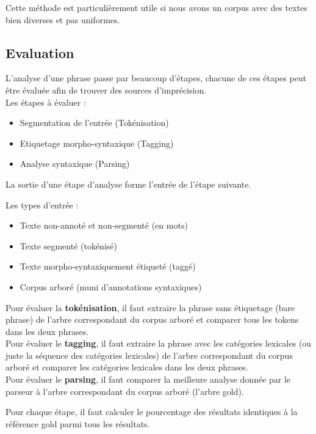 \documentclass[12pt]{article}
\begin{document}
Cette m\'ethode est particuli\`erement utile si nous avons un corpus avec des
textes bien diverses et pas uniformes. 

\subsection{Evaluation}

L'analyse d'une phrase passe par beaucoup d'\'etapes, chacune de ces \'etapes peut
\^etre \'evalu\'ee afin de trouver des sources d'impr\'ecision.\\

Les \'etapes \`a \'evaluer :
\begin{itemize}
\item Segmentation de l'entr\'ee (Tok\'enisation)
\item Etiquetage morpho-syntaxique (Tagging)
\item Analyse syntaxique (Parsing)
\end{itemize}


La sortie d'une \'etape d'analyse forme l'entr\'ee de l'\'etape suivante. 

Les types d'entr\'ee :
\begin{itemize}
\item Texte non-annot\'e et non-segment\'e (en mots)
\item Texte segment\'e (tok\'enis\'e)
\item Texte morpho-syntaxiquement \'etiquet\'e (tagg\'e)
\item Corpus arbor\'e (muni d'annotations syntaxiques)
\end{itemize}

Pour \'evaluer la \textbf{tok\'enisation}, il faut extraire la phrase sans
\'etiquetage (bare phrase) de l'arbre correspondant du corpus arbor\'e et comparer
tous les tokens dans les deux phrases. \\

Pour \'evaluer le \textbf{tagging}, il faut extraire la phrase avec les cat\'egories
lexicales (ou juste la s\'equence des cat\'egories lexicales) de l'arbre
correspondant du corpus arbor\'e et comparer les cat\'egories lexicales dans les
deux phrases.\\

Pour \'evaluer le \textbf{parsing}, il faut comparer la meilleure analyse donn\'ee
par le parseur \`a l'arbre correspondant du corpus arbor\'e (l'arbre gold).

Pour chaque \'etape, il faut calculer le pourcentage des r\'esultats identiques \`a
la r\'ef\'erence gold parmi tous les r\'esultats.
\end{document}

